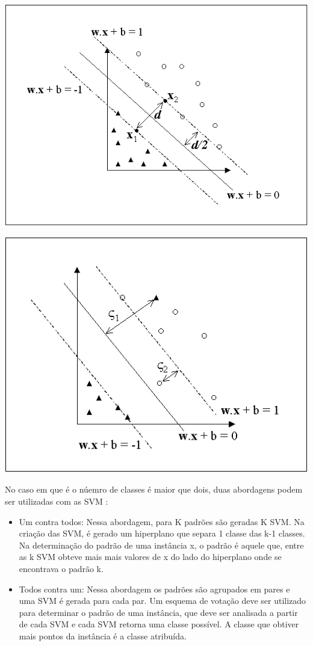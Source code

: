 \begin{center}
	\includegraphics[scale=0.5]{graficos/SVm1}
	\label{img:svm1}
\end{center}

\begin{center}
	\includegraphics[scale=0.5]{graficos/SVM2}
	\label{img:svm2}
\end{center}

No caso em que é o núemro de classes é maior que dois, duas abordagens podem ser utilizadas com as SVM \cite{Lorena03SVM}:
\begin{itemize}
\item{Um contra todos: }Nessa abordagem, para K padrões são geradas K SVM. Na criação das SVM, é gerado um hiperplano que separa 1 classe das k-1 classes. Na determinação do padrão de uma instância x, o padrão é aquele que, entre as k SVM obteve mais mais valores de x do lado do hiperplano onde se encontrava o padrão k.  
\item{Todos contra um: }Nessa abordagem os padrões são agrupados em pares e uma SVM é gerada para cada par. Um esquema de votação deve ser utilizado para determinar o padrão de uma instância, que deve ser analisada a partir de cada SVM e cada SVM retorna uma classe possível. A classe que obtiver mais pontos da instância é a classe atribuída.
\end{itemize}

